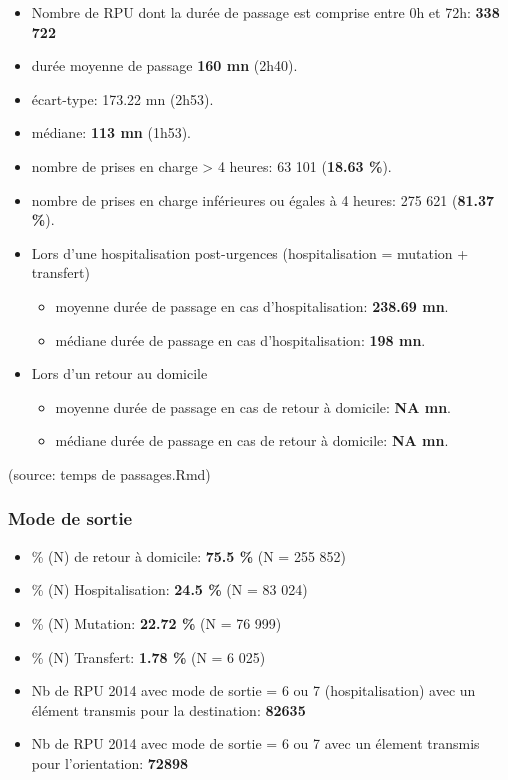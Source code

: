 \documentclass[]{article}
\begin{document}
\begin{itemize}
\item
  Nombre de RPU dont la durée de passage est comprise entre 0h et 72h:
  \textbf{338 722}
\item
  durée moyenne de passage \textbf{160 mn} (2h40).
\item
  écart-type: 173.22 mn (2h53).
\item
  médiane: \textbf{113 mn} (1h53).
\item
  nombre de prises en charge \textgreater{} 4 heures: 63 101
  (\textbf{18.63 \%}).
\item
  nombre de prises en charge inférieures ou égales à 4 heures: 275 621
  (\textbf{81.37 \%}).
\item
  Lors d'une hospitalisation post-urgences (hospitalisation = mutation +
  transfert)

  \begin{itemize}
  \itemsep1pt\parskip0pt
  \item
    moyenne durée de passage en cas d'hospitalisation: \textbf{238.69
    mn}.
  \item
    médiane durée de passage en cas d'hospitalisation: \textbf{198 mn}.
  \end{itemize}
\item
  Lors d'un retour au domicile

  \begin{itemize}
  \itemsep1pt\parskip0pt
  \item
    moyenne durée de passage en cas de retour à domicile: \textbf{NA
    mn}.
  \item
    médiane durée de passage en cas de retour à domicile: \textbf{NA
    mn}.
  \end{itemize}
\end{itemize}

(source: temps de passages.Rmd)

\subsubsection{Mode de sortie}\label{mode-de-sortie}

\begin{itemize}
\itemsep1pt\parskip0pt
\item
  \% (N) de retour à domicile: \textbf{75.5 \%} (N = 255 852)
\item
  \% (N) Hospitalisation: \textbf{24.5 \%} (N = 83 024)
\item
  \% (N) Mutation: \textbf{22.72 \%} (N = 76 999)
\item
  \% (N) Transfert: \textbf{1.78 \%} (N = 6 025)
\item
  Nb de RPU 2014 avec mode de sortie = 6 ou 7 (hospitalisation) avec un
  élément transmis pour la destination: \textbf{82635}
\item
  Nb de RPU 2014 avec mode de sortie = 6 ou 7 avec un élement transmis
  pour l'orientation: \textbf{72898}
\end{itemize}
\end{document}
